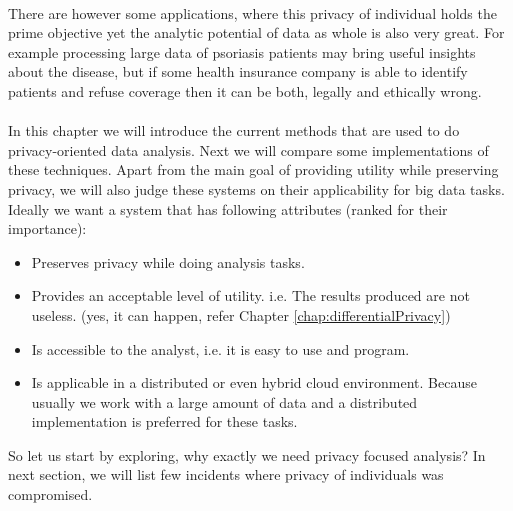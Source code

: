 \documentclass[12pt]{report}
\theoremstyle{named}
\begin{document}
\paragraph{}
There are however some applications, where this privacy of individual holds the prime objective yet the analytic potential of data as whole is also very great. For example processing large data of psoriasis patients may bring useful insights about the disease, but if some health insurance company is able to identify patients and refuse coverage then it can be both, legally and ethically wrong. 

\paragraph{}
In this chapter we will introduce the current methods that are used to do privacy-oriented data analysis. Next we will compare some implementations of these techniques. Apart from the main goal of providing utility while preserving privacy, we will also judge these systems on their applicability for big data tasks. Ideally we want a system that has following attributes (ranked for their importance):
\begin{itemize}
  \item Preserves privacy while doing analysis tasks.
  \item Provides an acceptable level of utility. i.e. The results produced are not useless. (yes, it can happen, refer Chapter \ref{chap:differentialPrivacy})
  \item Is accessible to the analyst, i.e. it is easy to use and program.
  \item Is applicable in a distributed or even hybrid cloud environment. Because usually we work with a large amount of data and a distributed implementation is preferred for these tasks.
\end{itemize}

So let us start by exploring, why exactly we need privacy focused analysis? In next section, we will list few incidents where privacy of individuals was compromised.

\end{document}
